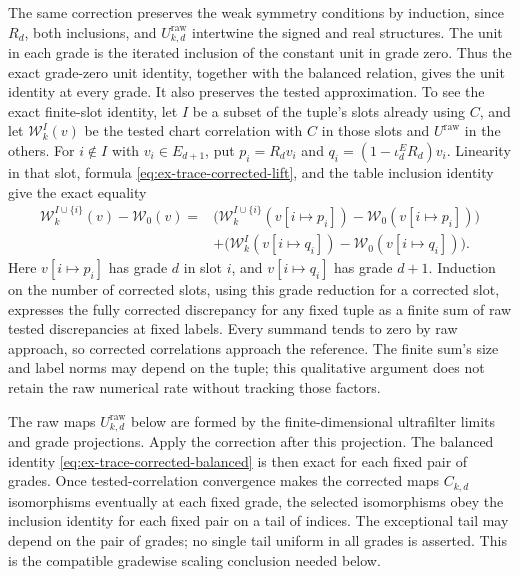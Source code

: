 The same correction preserves the weak symmetry conditions by induction,
since $R_d$, both inclusions, and $U^{\mathrm{raw}}_{k,d}$ intertwine the signed and real
structures. The unit in each grade is the iterated inclusion of the
constant unit in grade zero. Thus the exact grade-zero unit identity, together
with the balanced relation, gives the unit identity at every grade. It also
preserves the tested approximation. To see the exact
finite-slot identity, let $I$ be a subset of the tuple's slots already using
$C$, and let $\mathcal W_k^I(v)$ be the tested chart correlation with $C$ in
those slots and $U^{\mathrm{raw}}$ in the others. For $i\notin I$ with $v_i\in E_{d+1}$,
put $p_i=R_dv_i$ and $q_i=(1-\iota^E_dR_d)v_i$. Linearity in that slot,
formula \eqref{eq:ex-trace-corrected-lift}, and the table inclusion identity
give the exact equality
\begin{align*}
\mathcal W_k^{I\cup\{i\}}(v)-\mathcal W_0(v)
={}&\bigl(\mathcal W_k^{I\cup\{i\}}(v[i\mapsto p_i])
             -\mathcal W_0(v[i\mapsto p_i])\bigr)\\
 &+\bigl(\mathcal W_k^I(v[i\mapsto q_i])
             -\mathcal W_0(v[i\mapsto q_i])\bigr).
\end{align*}
Here $v[i\mapsto p_i]$ has grade $d$ in slot $i$, and
$v[i\mapsto q_i]$ has grade $d+1$. Induction on the number of corrected
slots, using this grade reduction for a corrected slot, expresses the fully
corrected discrepancy for any fixed tuple as a finite sum of raw tested
discrepancies at fixed labels. Every summand tends to zero by raw approach,
so corrected correlations approach the reference. The finite sum's size and
label norms may depend on the tuple; this qualitative argument does not
retain the raw numerical rate without tracking those factors.

The raw maps $U^{\mathrm{raw}}_{k,d}$ below are formed by the finite-dimensional
ultrafilter limits and grade projections. Apply the correction after this
projection. The balanced identity
\eqref{eq:ex-trace-corrected-balanced} is then exact for each fixed pair of
grades. Once tested-correlation convergence makes the corrected maps
$C_{k,d}$ isomorphisms eventually at each fixed grade, the selected
isomorphisms obey the inclusion identity for each fixed pair on a tail of
indices. The exceptional tail may depend on
the pair of grades; no single tail uniform in all grades is asserted. This
is the compatible gradewise scaling conclusion needed below.

